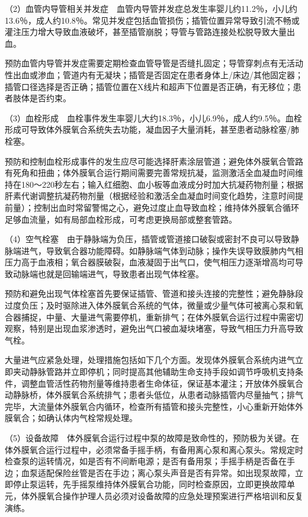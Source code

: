 （2）血管内导管相关并发症　血管内导管并发症总发生率婴儿约11.2％，小儿约13.6％，成人约10.8％。常见并发症包括血管损伤；插管位置异常导致引流不畅或灌注压力增大导致血液破坏，甚至插管崩脱；导管与管路连接处松脱导致大量出血。

预防血管内导管并发症需要定期检查血管导管是否缝扎固定；导管穿刺点有无活动性出血或渗血；管道内有无凝块；插管是否固定在患者身体上/床边/其他固定器；插管口径选择是否正确；插管位置在X线片和超声下位置是否正确，有无移位；患者肢体是否约束。

（3）血栓形成　血栓事件发生率婴儿大约18.3％，小儿6.9％，成人约9.5％。血栓形成可导致体外膜氧合系统失去功能，凝血因子大量消耗，甚至患者动脉栓塞/肺栓塞。

预防和控制血栓形成事件的发生应尽可能选择肝素涂层管道；避免体外膜氧合管路有死角和扭曲；体外膜氧合运行期间需要完善常规抗凝，监测激活全血凝血时间维持在180～220秒左右；输入红细胞、血小板等血液成分时加大抗凝药物剂量；根据肝素代谢调整抗凝药物剂量（根据经验和激活全血凝血时间变化趋势，注意时间提前量）；控制出血时常留警惕之心，避免过度止血导致血栓；维持体外膜氧合循环足够血流量，如有局部血栓形成，可考虑更换局部或整套管路。

（4）空气栓塞　由于静脉端为负压，插管或管道接口破裂或密封不良可以导致静脉端进气，导致氧合器功能障碍。如静脉端气体到动脉；操作失误导致膜肺内气相压力高于血液相；氧合器膜破裂，血液凝固于出气口，使气相压力逐渐增高均可导致动脉端也就是回输端进气，导致患者出现气体栓塞。

预防和避免出现气体栓塞首先要保证插管、管道和接头连接的完整性；避免静脉段过度负压；及时驱除进入体外膜氧合系统的气体，微量或少量气体可被离心泵和氧合器捕捉，中量、大量进气需要停机，重新排气；在体外膜氧合运行过程中需密切观察，特别是出现血浆渗透时，避免出气口被血凝块堵塞，导致气相压力升高导致气栓。

大量进气应紧急处理，处理措施包括如下几个方面。发现体外膜氧合系统内进气立即夹动静脉管路并立即停机；同时提高其他辅助生命支持手段如调节呼吸机支持条件，调整血管活性药物剂量等维持患者生命体征，保证基本灌注；开放体外膜氧合动静脉桥，体外膜氧合系统排气；患者头低位，从患者动脉插管内尽量抽气；排气完毕，大流量体外膜氧合内循环，检查所有插管和接头完整性，小心重新开始体外膜氧合；如确认体内气栓常规处理。

（5）设备故障　体外膜氧合运行过程中泵的故障是致命性的，预防极为关键。在体外膜氧合运行过程中，必须常备手摇手柄，有备用离心泵和离心泵头。常规定时检查泵的运转情况，如是否有不间断电源；是否有备用泵；手摇手柄是否备在手边；血泵适配保险丝管是否在手边；离心泵头声音是否有异常。如出现泵故障，立即停止泵运转，先手摇泵维持体外膜氧合功能，同时检查原因，立即更换故障单元，体外膜氧合操作护理人员必须对设备故障的应急处理预案进行严格培训和反复演练。

